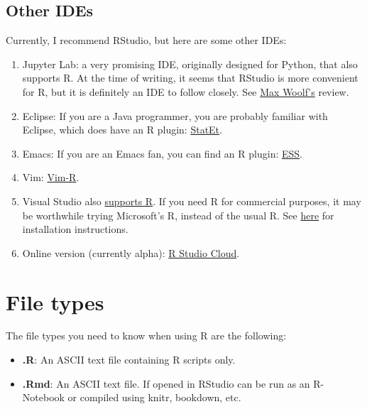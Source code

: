\documentclass[]{book}
\providecommand{\tightlist}{%
  \setlength{\itemsep}{0pt}\setlength{\parskip}{0pt}}
\theoremstyle{definition}
\theoremstyle{definition}
\theoremstyle{definition}
\theoremstyle{remark}
\begin{document}
\subsection{Other IDEs}\label{other-ides}

Currently, I recommend RStudio, but here are some other IDEs:

\begin{enumerate}
\def\labelenumi{\arabic{enumi}.}
\item
  Jupyter Lab: a very promising IDE, originally designed for Python,
  that also supports R. At the time of writing, it seems that RStudio is
  more convenient for R, but it is definitely an IDE to follow closely.
  See \href{http://minimaxir.com/2017/06/r-notebooks/}{Max Woolf's}
  review.
\item
  Eclipse: If you are a Java programmer, you are probably familiar with
  Eclipse, which does have an R plugin:
  \href{http://www.walware.de/goto/statet}{StatEt}.
\item
  Emacs: If you are an Emacs fan, you can find an R plugin:
  \href{http://ess.r-project.org/}{ESS}.
\item
  Vim: \href{https://github.com/vim-scripts/Vim-R-plugin}{Vim-R}.
\item
  Visual Studio also
  \href{https://www.visualstudio.com/vs/features/rtvs/}{supports R}. If
  you need R for commercial purposes, it may be worthwhile trying
  Microsoft's R, instead of the usual R. See
  \href{https://mran.microsoft.com/documents/rro/installation}{here} for
  installation instructions.
\item
  Online version (currently alpha): \href{https://rstudio.cloud}{R
  Studio Cloud}.
\end{enumerate}

\section{File types}\label{file-types}

The file types you need to know when using R are the following:

\begin{itemize}
\tightlist
\item
  \textbf{.R}: An ASCII text file containing R scripts only.
\item
  \textbf{.Rmd}: An ASCII text file. If opened in RStudio can be run as
  an R-Notebook or compiled using knitr, bookdown, etc.
\end{itemize}
\end{document}

